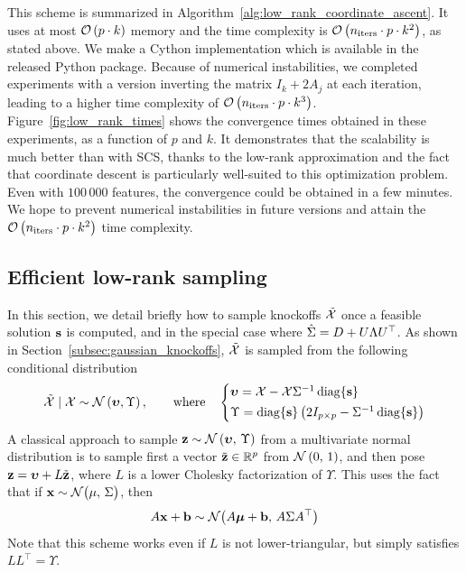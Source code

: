 This scheme is summarized in Algorithm~\ref{alg:low_rank_coordinate_ascent}.
It uses at most $\mathcal{O}\left( p \cdot k \right)$ memory
and the time complexity is $\mathcal{O}\left( n_\text{iters} \cdot p \cdot k^2 \right)$, as stated above.
We make a Cython implementation which is available in the released Python package.
Because of numerical instabilities, we completed experiments with a version inverting the matrix
$I_k + 2A_j$ at each iteration, leading to a higher time complexity of
$\mathcal{O}\left( n_\text{iters} \cdot p \cdot k^3 \right)$.
Figure~\ref{fig:low_rank_times} shows the convergence times obtained in these experiments,
as a function of $p$ and $k$.
It demonstrates that the scalability is much better than with SCS,
thanks to the low-rank approximation and the fact that coordinate descent
is particularly well-suited to this optimization problem.
Even with $100\,000$ features, the convergence could be obtained in a few minutes.
We hope to prevent numerical instabilities in future versions and attain the
$\mathcal{O}\left( n_\text{iters} \cdot p \cdot k^2 \right)$ time complexity.

\subsection{Efficient low-rank sampling}\label{subsec:low_rank_sampling}

In this section, we detail briefly how to sample knockoffs $\tilde{\mathcal{X}}$ once
a feasible solution $\mathbf{s}$ is computed,
and in the special case where $\hat{\Sigma} = D + U\Lambda U^\top$.
As shown in Section~\ref{subsec:gaussian_knockoffs},
$\tilde{\mathcal{X}}$ is sampled from the following conditional distribution
\begin{equation}\label{eq:conditional_gaussian_knockoffs3}
    \tcX \mid \cX \sim \cN\left( \bupsilon, \Upsilon \right)
    ,\qquad\text{where}\quad
    \begin{cases*}
        \bupsilon = \cX - \cX\Sigma^{-1}\diag\{ \bs \}\\
        \Upsilon = \diag\{ \bs \}\left( 2I_{p \times p} - \Sigma^{-1}\diag\{ \bs \} \right)
    \end{cases*}
\end{equation}
A classical approach to sample
$\mathbf{z} \sim \mathcal{N}\left( \bm{\upsilon},\, \Upsilon \right)$
from a multivariate normal distribution is to sample first a vector
$\tilde{\mathbf{z}} \in \mathbb{R}^p$ from $\mathcal{N}\left( 0,\, 1 \right)$,
and then pose $\mathbf{z} = \bm{\upsilon} + L\tilde{\mathbf{z}}$,
where $L$ is a lower Cholesky factorization of $\Upsilon$.
This uses the fact that if $\mathbf{x} \sim \mathcal{N}\big( \mu,\, \Sigma \big)$,
then
\begin{equation}\label{eq:affine_transformation}
    A\mathbf{x} + \mathbf{b} \sim \mathcal{N}\big( A\bm{\mu} + \mathbf{b},\, A\Sigma A^\top \big)
\end{equation}
Note that this scheme works even if $L$ is not lower-triangular,
but simply satisfies $LL^\top = \Upsilon$.

